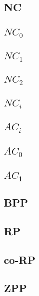 \documentclass[]{article}
\theoremstyle{definition}
\begin{document}
\subsection{NC}

\subsection{$NC_0$}

\subsection{$NC_1$}

\subsection{$NC_2$}

\subsection{$NC_i$}

\subsection{$AC_i$}

\subsection{$AC_0$}

\subsection{$AC_1$}

\subsection{BPP}

\subsection{RP}

\subsection{co-RP}

\subsection{ZPP}
\end{document}
